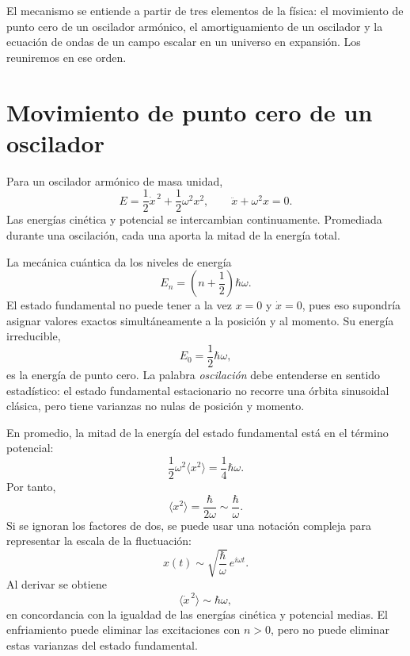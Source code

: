 El mecanismo se entiende a partir de tres elementos de la física: el movimiento de punto cero de un oscilador armónico, el amortiguamiento de un oscilador y la ecuación de ondas de un campo escalar en un universo en expansión. Los reuniremos en ese orden.

\section{Movimiento de punto cero de un oscilador}

Para un oscilador armónico de masa unidad,
\begin{equation}
E=\frac12\dot x^{\,2}+\frac12\omega^2x^2,
\qquad
\ddot x+\omega^2x=0.
\label{eq:c10-undamped}
\end{equation}
Las energías cinética y potencial se intercambian continuamente. Promediada durante una oscilación, cada una aporta la mitad de la energía total.

La mecánica cuántica da los niveles de energía
\begin{equation}
E_n=\left(n+\frac12\right)\hbar\omega.
\label{eq:c10-oscillator-levels}
\end{equation}
El estado fundamental no puede tener a la vez \(x=0\) y \(\dot x=0\), pues eso supondría asignar valores exactos simultáneamente a la posición y al momento. Su energía irreducible,
\[
E_0=\frac12\hbar\omega,
\]
es la energía de punto cero. La palabra \emph{oscilación} debe entenderse en sentido estadístico: el estado fundamental estacionario no recorre una órbita sinusoidal clásica, pero tiene varianzas no nulas de posición y momento.

En promedio, la mitad de la energía del estado fundamental está en el término potencial:
\[
\frac12\omega^2\langle x^2\rangle
=\frac14\hbar\omega.
\]
Por tanto,
\begin{equation}
\langle x^2\rangle=\frac{\hbar}{2\omega}
\sim\frac{\hbar}{\omega}.
\label{eq:c10-zero-point-position}
\end{equation}
Si se ignoran los factores de dos, se puede usar una notación compleja para representar la escala de la fluctuación:
\[
x(t)\sim\sqrt{\frac{\hbar}{\omega}}\,e^{i\omega t}.
\]
Al derivar se obtiene
\begin{equation}
\langle\dot x^{\,2}\rangle\sim\hbar\omega,
\label{eq:c10-zero-point-velocity}
\end{equation}
en concordancia con la igualdad de las energías cinética y potencial medias. El enfriamiento puede eliminar las excitaciones con \(n>0\), pero no puede eliminar estas varianzas del estado fundamental.

